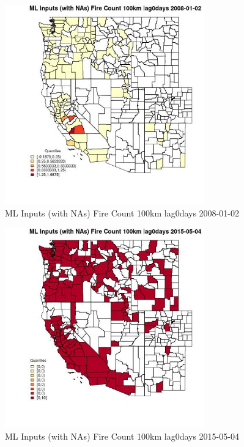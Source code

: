 \clearpage 

\begin{figure} 
\centering  
\includegraphics[width=0.77\textwidth]{Code_Outputs/Report_ML_input_PM25_Step4_part_e_de_duplicated_aves_compiled_2019-05-18wNAs_CountyFire_Count_100km_lag0daysMean2008-01-02_2008-01-02.jpg} 
\caption{\label{fig:Report_ML_input_PM25_Step4_part_e_de_duplicated_aves_compiled_2019-05-18wNAsCountyFire_Count_100km_lag0daysMean2008-01-02_2008-01-02}ML Inputs (with NAs) Fire Count 100km lag0days 2008-01-02} 
\end{figure} 
 

\begin{figure} 
\centering  
\includegraphics[width=0.77\textwidth]{Code_Outputs/Report_ML_input_PM25_Step4_part_e_de_duplicated_aves_compiled_2019-05-18wNAs_CountyFire_Count_100km_lag0daysMean2015-05-04_2015-05-04.jpg} 
\caption{\label{fig:Report_ML_input_PM25_Step4_part_e_de_duplicated_aves_compiled_2019-05-18wNAsCountyFire_Count_100km_lag0daysMean2015-05-04_2015-05-04}ML Inputs (with NAs) Fire Count 100km lag0days 2015-05-04} 
\end{figure} 
 

